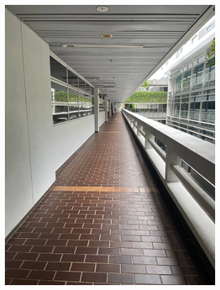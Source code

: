 \documentclass[12pt]{report}
\begin{document}
\begin{figure}[h]
\begin{subfigure}[b]{0.19\textwidth}
        \includegraphics[width=\textwidth]{walking-area-3}
    \end{subfigure}
    \begin{subfigure}[b]{0.19\textwidth}
        \centering

\end{subfigure}
\end{figure}
\end{document}
